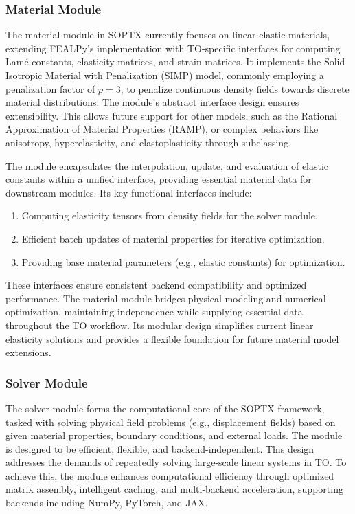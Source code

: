 \documentclass[mathpazo]{cicp}
\begin{document}
\subsubsection{Material Module}
The material module in SOPTX currently focuses on linear elastic materials, extending FEALPy’s implementation with TO-specific interfaces for computing Lamé constants, elasticity matrices, and strain matrices. It implements the Solid Isotropic Material with Penalization (SIMP) model, commonly employing a penalization factor of $p=3$, to penalize  continuous density fields towards discrete material distributions. The module’s abstract interface design ensures extensibility. This allows future support for other models, such as the Rational Approximation of Material Properties (RAMP), or complex behaviors like anisotropy, hyperelasticity, and elastoplasticity through subclassing.

The module encapsulates the interpolation, update, and evaluation of elastic constants within a unified interface, providing essential material data for downstream modules. Its key functional interfaces include:
\begin{enumerate}
	\item Computing elasticity tensors from density fields for the solver module.
	\item Efficient batch updates of material properties for iterative optimization.
	\item Providing base material parameters (e.g., elastic constants) for optimization.
\end{enumerate}

These interfaces ensure consistent backend compatibility and optimized performance. The material module bridges physical modeling and numerical optimization, maintaining independence while supplying essential data throughout the TO workflow. Its modular design simplifies current linear elasticity solutions and provides a flexible foundation for future material model extensions.

\subsubsection{Solver Module}
The solver module forms the computational core of the SOPTX framework, tasked with solving physical field problems (e.g., displacement fields) based on given material properties, boundary conditions, and external loads. The module is designed to be efficient, flexible, and backend-independent. This design addresses the demands of repeatedly solving large-scale linear systems in TO. To achieve this, the module enhances computational efficiency through optimized matrix assembly, intelligent caching, and multi-backend acceleration, supporting backends including NumPy, PyTorch, and JAX.
\end{document}

